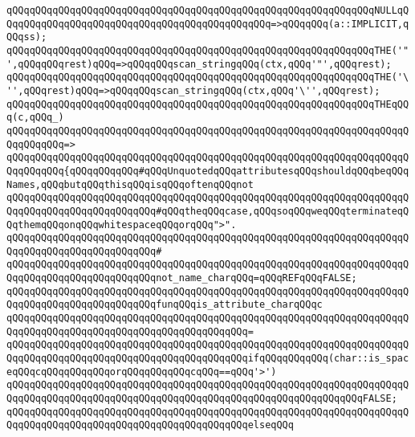 \verb|qQQqqQQqqQQqqQQqqQQqqQQqqQQqqQQqqQQqqQQqqQQqqQQqqQQqqQQqqQQqqQQqNULLqQQqqQQqqQQqqQQqqQQqqQQqqQQqqQQqqQQqqQQqqQQqqQQq=>qQQqqQQq(a::IMPLICIT,qQQqss);|\newline
\verb|qQQqqQQqqQQqqQQqqQQqqQQqqQQqqQQqqQQqqQQqqQQqqQQqqQQqqQQqqQQqqQQqTHE('"',qQQqqQQqrest)qQQq=>qQQqqQQqscan_stringqQQq(ctx,qQQq'"',qQQqrest);|\newline
\verb|qQQqqQQqqQQqqQQqqQQqqQQqqQQqqQQqqQQqqQQqqQQqqQQqqQQqqQQqqQQqqQQqTHE('\'',qQQqrest)qQQq=>qQQqqQQqscan_stringqQQq(ctx,qQQq'\'',qQQqrest);|\newline
\newline
\verb|qQQqqQQqqQQqqQQqqQQqqQQqqQQqqQQqqQQqqQQqqQQqqQQqqQQqqQQqqQQqqQQqTHEqQQq(c,qQQq_)|\newline
\verb|qQQqqQQqqQQqqQQqqQQqqQQqqQQqqQQqqQQqqQQqqQQqqQQqqQQqqQQqqQQqqQQqqQQqqQQqqQQqqQQq=>|\newline
\verb|qQQqqQQqqQQqqQQqqQQqqQQqqQQqqQQqqQQqqQQqqQQqqQQqqQQqqQQqqQQqqQQqqQQqqQQqqQQqqQQq{qQQqqQQqqQQq#qQQqUnquotedqQQqattributesqQQqshouldqQQqbeqQQqNames,qQQqbutqQQqthisqQQqisqQQqoftenqQQqnot|\newline
\verb|qQQqqQQqqQQqqQQqqQQqqQQqqQQqqQQqqQQqqQQqqQQqqQQqqQQqqQQqqQQqqQQqqQQqqQQqqQQqqQQqqQQqqQQqqQQqqQQq#qQQqtheqQQqcase,qQQqsoqQQqweqQQqterminateqQQqthemqQQqonqQQqwhitespaceqQQqorqQQq">".|\newline
\verb|qQQqqQQqqQQqqQQqqQQqqQQqqQQqqQQqqQQqqQQqqQQqqQQqqQQqqQQqqQQqqQQqqQQqqQQqqQQqqQQqqQQqqQQqqQQqqQQq#|\newline
\verb|qQQqqQQqqQQqqQQqqQQqqQQqqQQqqQQqqQQqqQQqqQQqqQQqqQQqqQQqqQQqqQQqqQQqqQQqqQQqqQQqqQQqqQQqqQQqqQQqnot_name_charqQQq=qQQqREFqQQqFALSE;|\newline
\newline
\verb|qQQqqQQqqQQqqQQqqQQqqQQqqQQqqQQqqQQqqQQqqQQqqQQqqQQqqQQqqQQqqQQqqQQqqQQqqQQqqQQqqQQqqQQqqQQqqQQqfunqQQqis_attribute_charqQQqc|\newline
\verb|qQQqqQQqqQQqqQQqqQQqqQQqqQQqqQQqqQQqqQQqqQQqqQQqqQQqqQQqqQQqqQQqqQQqqQQqqQQqqQQqqQQqqQQqqQQqqQQqqQQqqQQqqQQqqQQq=|\newline
\verb|qQQqqQQqqQQqqQQqqQQqqQQqqQQqqQQqqQQqqQQqqQQqqQQqqQQqqQQqqQQqqQQqqQQqqQQqqQQqqQQqqQQqqQQqqQQqqQQqqQQqqQQqqQQqqQQqifqQQqqQQqqQQq(char::is_spaceqQQqcqQQqqQQqqQQqorqQQqqQQqqQQqcqQQq==qQQq'>')|\newline
\verb|qQQqqQQqqQQqqQQqqQQqqQQqqQQqqQQqqQQqqQQqqQQqqQQqqQQqqQQqqQQqqQQqqQQqqQQqqQQqqQQqqQQqqQQqqQQqqQQqqQQqqQQqqQQqqQQqqQQqqQQqqQQqqQQqqQQqFALSE;|\newline
\verb|qQQqqQQqqQQqqQQqqQQqqQQqqQQqqQQqqQQqqQQqqQQqqQQqqQQqqQQqqQQqqQQqqQQqqQQqqQQqqQQqqQQqqQQqqQQqqQQqqQQqqQQqqQQqqQQqelseqQQq|\newline
